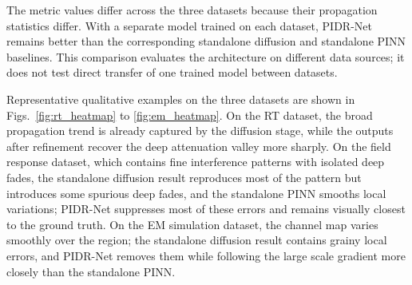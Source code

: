 \documentclass[lettersize,journal]{IEEEtran}
\begin{document}
\begin{table}[t]
\caption{Cross dataset comparison under the same sparse observation setting.}
\label{tab:cross_dataset_results}
\centering
\small
{}
\end{table}
The metric values differ across the three datasets because their propagation statistics differ. With a separate model trained on each dataset, PIDR-Net remains better than the corresponding standalone diffusion and standalone PINN baselines. This comparison evaluates the architecture on different data sources; it does not test direct transfer of one trained model between datasets.

Representative qualitative examples on the three datasets are shown in Figs.~\ref{fig:rt_heatmap} to \ref{fig:em_heatmap}. On the RT dataset, the broad propagation trend is already captured by the diffusion stage, while the outputs after refinement recover the deep attenuation valley more sharply. On the field response dataset, which contains fine interference patterns with isolated deep fades, the standalone diffusion result reproduces most of the pattern but introduces some spurious deep fades, and the standalone PINN smooths local variations; PIDR-Net suppresses most of these errors and remains visually closest to the ground truth. On the EM simulation dataset, the channel map varies smoothly over the region; the standalone diffusion result contains grainy local errors, and PIDR-Net removes them while following the large scale gradient more closely than the standalone PINN.
\end{document}
